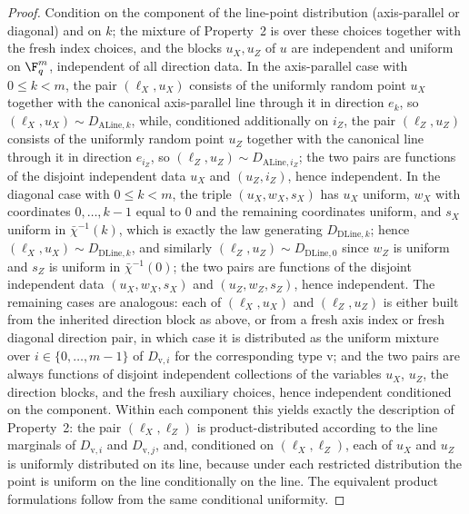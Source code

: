 \begin{proof}
	Condition on the component of the line-point distribution
	(axis-parallel or diagonal) and on $k$; the mixture of Property~2 is
	over these choices together with the fresh index choices, and the
	blocks $u_X, u_Z$ of $u$ are independent and uniform on $\F_q^m$,
	independent of all direction data. In the axis-parallel case with
	$0 \le k < m$, the pair $(\ell_X, u_X)$ consists of the uniformly
	random point $u_X$ together with the canonical axis-parallel line
	through it in direction $e_k$, so
	$(\ell_X, u_X) \sim D_{\mathrm{ALine},k}$, while, conditioned
	additionally on $i_Z$, the pair $(\ell_Z, u_Z)$ consists of the
	uniformly random point $u_Z$ together with the canonical line through
	it in direction $e_{i_Z}$, so
	$(\ell_Z, u_Z) \sim D_{\mathrm{ALine},i_Z}$; the two pairs are
	functions of the disjoint independent data $u_X$ and $(u_Z, i_Z)$,
	hence independent. In the diagonal case with $0 \le k < m$, the
	triple $(u_X, w_X, s_X)$ has $u_X$ uniform, $w_X$ with coordinates
	$0, \dots, k-1$ equal to $0$ and the remaining coordinates uniform,
	and $s_X$ uniform in $\bar\chi^{-1}(k)$, which is exactly the law
	generating $D_{\mathrm{DLine},k}$; hence
	$(\ell_X, u_X) \sim D_{\mathrm{DLine},k}$, and similarly
	$(\ell_Z, u_Z) \sim D_{\mathrm{DLine},0}$ since $w_Z$ is uniform and
	$s_Z$ is uniform in $\bar\chi^{-1}(0)$; the two pairs are functions of
	the disjoint independent data $(u_X, w_X, s_X)$ and $(u_Z, w_Z, s_Z)$,
	hence independent. The remaining cases are analogous: each of
	$(\ell_X, u_X)$ and $(\ell_Z, u_Z)$ is either built from the inherited
	direction block as above, or from a fresh axis index or fresh diagonal
	direction pair, in which case it is distributed as the uniform mixture
	over $i \in \{0, \dots, m-1\}$ of $D_{\mathrm{v},i}$ for the
	corresponding type $\mathrm{v}$; and the two pairs are always functions of
	disjoint independent collections of the variables $u_X$, $u_Z$, the
	direction blocks, and the fresh auxiliary choices, hence independent
	conditioned on the component. Within each component this yields exactly the
	description of Property~2: the pair $(\ell_X, \ell_Z)$ is
	product-distributed according to the line marginals of
	$D_{\mathrm{v},i}$ and $D_{\mathrm{v},j}$, and, conditioned on
	$(\ell_X, \ell_Z)$, each of $u_X$ and $u_Z$ is uniformly distributed
	on its line, because under each restricted distribution the point is
	uniform on the line conditionally on the line. The equivalent product
	formulations follow from the same conditional uniformity.
\end{proof}

